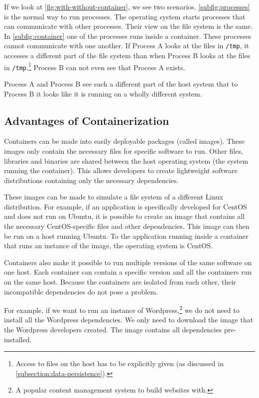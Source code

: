If we look at \autoref{fig:with-without-container}, we see two scenarios. \autoref{subfig:processes} is the normal way to run processes. The operating system starts processes that can communicate with other processes. Their view on the file system is the same.
In \autoref{subfig:container} one of the processes runs inside a container. These processes cannot communicate with one another. If Process A looks at the files in \lstinline{/tmp}, it accesses a different part of the file system than when Process B looks at the files in \lstinline{/tmp}.\footnote{Access to files on the host has to be explicitly given (as discussed in \autoref{subsection:data-persistence}).} Process B can not even see that Process A exists.

\medskip

Process A and Process B see such a different part of the host system that to Process B it looks like it is running on a wholly different system.

\subsection{Advantages of Containerization}
Containers can be made into easily deployable packages (called images). These images only contain the necessary files for specific software to run. Other files, libraries and binaries are shared between the host operating system (the system running the container). This allows developers to create lightweight software distributions containing only the necessary dependencies.

These images can be made to simulate a file system of a different Linux distribution. For example, if an application is specifically developed for CentOS and does not run on Ubuntu, it is possible to create an image that contains all the necessary CentOS-specific files and other dependencies. This image can then be run on a host running Ubuntu. To the application running inside a container that runs an instance of the image, the operating system is CentOS\@.

\medskip

Containers also make it possible to run multiple versions of the same software on one host. Each container can contain a specific version and all the containers run on the same host. Because the containers are isolated from each other, their incompatible dependencies do not pose a problem.

\medskip

For example, if we want to run an instance of Wordpress,\footnote{A popular content management system to build websites with.} we do not need to install all the Wordpress dependencies. We only need to download the image that the Wordpress developers created. The image contains all dependencies pre-installed.

